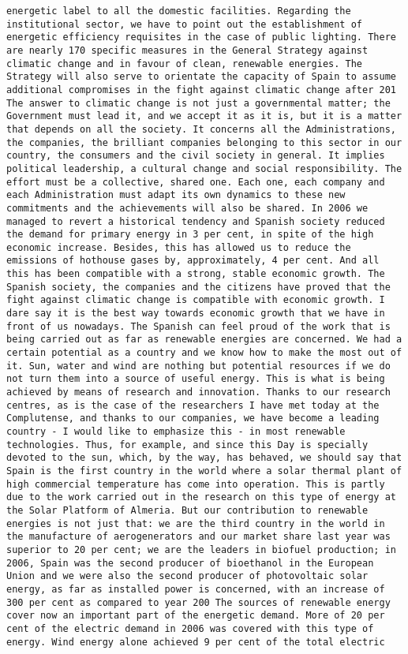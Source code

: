 \documentclass[
]{article}
\begin{document}
\begin{verbatim}
energetic label to all the domestic facilities. Regarding the institutional sector, we have to point out the establishment of energetic efficiency requisites in the case of public lighting. There are nearly 170 specific measures in the General Strategy against climatic change and in favour of clean, renewable energies. The Strategy will also serve to orientate the capacity of Spain to assume additional compromises in the fight against climatic change after 201 The answer to climatic change is not just a governmental matter; the Government must lead it, and we accept it as it is, but it is a matter that depends on all the society. It concerns all the Administrations, the companies, the brilliant companies belonging to this sector in our country, the consumers and the civil society in general. It implies political leadership, a cultural change and social responsibility. The effort must be a collective, shared one. Each one, each company and each Administration must adapt its own dynamics to these new commitments and the achievements will also be shared. In 2006 we managed to revert a historical tendency and Spanish society reduced the demand for primary energy in 3 per cent, in spite of the high economic increase. Besides, this has allowed us to reduce the emissions of hothouse gases by, approximately, 4 per cent. And all this has been compatible with a strong, stable economic growth. The Spanish society, the companies and the citizens have proved that the fight against climatic change is compatible with economic growth. I dare say it is the best way towards economic growth that we have in front of us nowadays. The Spanish can feel proud of the work that is being carried out as far as renewable energies are concerned. We had a certain potential as a country and we know how to make the most out of it. Sun, water and wind are nothing but potential resources if we do not turn them into a source of useful energy. This is what is being achieved by means of research and innovation. Thanks to our research centres, as is the case of the researchers I have met today at the Complutense, and thanks to our companies, we have become a leading country - I would like to emphasize this - in most renewable technologies. Thus, for example, and since this Day is specially devoted to the sun, which, by the way, has behaved, we should say that Spain is the first country in the world where a solar thermal plant of high commercial temperature has come into operation. This is partly due to the work carried out in the research on this type of energy at the Solar Platform of Almeria. But our contribution to renewable energies is not just that: we are the third country in the world in the manufacture of aerogenerators and our market share last year was superior to 20 per cent; we are the leaders in biofuel production; in 2006, Spain was the second producer of bioethanol in the European Union and we were also the second producer of photovoltaic solar energy, as far as installed power is concerned, with an increase of 300 per cent as compared to year 200 The sources of renewable energy cover now an important part of the energetic demand. More of 20 per cent of the electric demand in 2006 was covered with this type of energy. Wind energy alone achieved 9 per cent of the total electric 
\end{verbatim}
\end{document}
